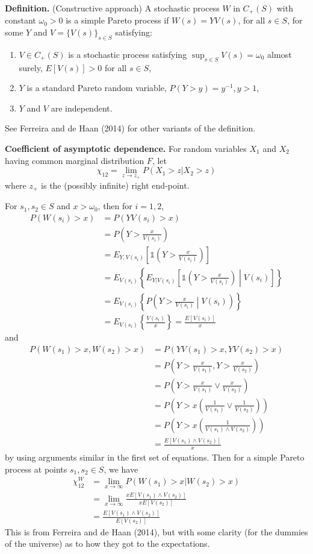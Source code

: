 \documentclass[12pt]{article}
\newcommand{\ind}{\mathds{1}}
\begin{document}
\textbf{Definition.} (Constructive approach) A stochastic process $W$ in $C_+(S)$ with constant $\omega_0>0$ is a simple Pareto process if $W(s) = Y V(s)$, for all $s\in S$, for some $Y$ and $V=\{V(s)\}_{s\in S}$ satisfying:
\begin{enumerate}[label=\alph*)]
\item $V\in C_+(S)$ is a stochastic process satisfying $\sup_{s\in S} V(s) = \omega_0$ almost surely, $E[V(s)]>0$ for all $s \in S$,
\item $Y$ is a standard Pareto random variable, $P(Y > y) = y^{-1}, y>1$,
\item $Y$ and $V$ are independent.
\end{enumerate}

See Ferreira and de Haan (2014) for other variants of the definition.
\bigskip

\textbf{Coefficient of asymptotic dependence.} For random variables $X_1$ and $X_2$ having common marginal distribution $F$, let
\[ \chi_{12} = \lim_{z\rightarrow z_+}P(X_1>z|X_2>z) \]
where $z_+$ is the (possibly infinite) right end-point.
\bigskip

For $s_1,s_2\in S$ and $x > \omega_0$, then for $i=1,2$,
\begin{align*}
P(W(s_i)>x) &= P(Y V(s_i) > x) \\
 &= P\left(Y > \frac{x}{V(s_i)}\right) \\
 &= E_{Y,V(s_i)}\left[\ind\left(Y > \frac{x}{V(s_i)}\right)\right] \\
 &= E_{V(s_i)}\left\{E_{Y|V(s_i)}\left[\ind\left(Y > \frac{x}{V(s_i)}\right) \middle| V(s_i) \right]\right\} \\
 &= E_{V(s_i)}\left\{P\left(Y > \frac{x}{V(s_i)} \middle| V(s_i) \right)\right\} \\
 &= E_{V(s_i)}\left\{\frac{V(s_i)}{x}\right\} = \frac{E[V(s_i)]}{x}
\end{align*}
and 
\begin{align*}
P(W(s_1)>x, W(s_2)>x) &= P(Y V(s_1) > x, Y V(s_2) > x) \\
 &= P\left(Y > \frac{x}{V(s_1)}, Y > \frac{x}{V(s_2)}\right) \\
 &= P\left(Y > \frac{x}{V(s_1)}\vee\frac{x}{V(s_2)}\right) \\
 &= P\left(Y > x \left(\frac{1}{V(s_1)}\vee\frac{1}{V(s_2)}\right)\right) \\
 &= P\left(Y > x \left(\frac{1}{V(s_1)\wedge V(s_2)}\right)\right) \\
 &= \frac{E[V(s_1)\wedge V(s_2)]}{x}
\end{align*}
by using arguments similar in the first set of equations. Then for a simple Pareto process at points $s_1,s_2\in S$, we have
\begin{align*}
\chi_{12}^W &= \lim_{x\rightarrow \infty} P(W(s_1) > x | W(s_2) > x) \\
 &= \lim_{x\rightarrow \infty} \frac{xE[V(s_1)\wedge V(s_2)]}{xE[V(s_2)]} \\
 &= \frac{E[V(s_1)\wedge V(s_2)]}{E[V(s_2)]}
\end{align*}
This is from Ferreira and de Haan (2014), but with some clarity (for the dummies of the universe) as to how they got to the expectations.
\bigskip
\end{document}

